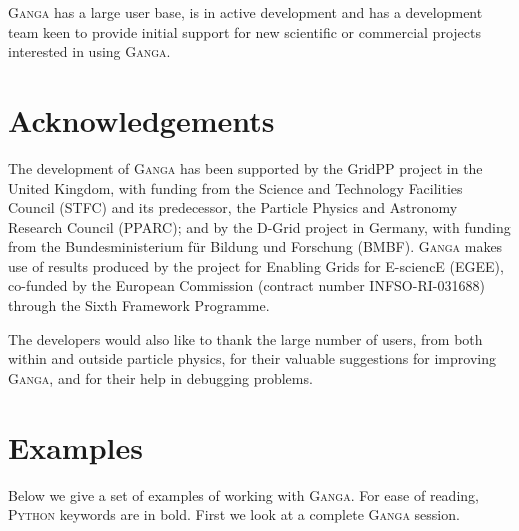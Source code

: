 \documentclass{elsart}
\def\ganga {\textsc{Ganga}\xspace}
\def\python {\textsc{Python}\xspace}
\begin{document}
\ganga has a large user base, is in active development and has a development
team keen to provide initial support for new scientific or commercial
projects interested in using \ganga.

\section{Acknowledgements}
\label{sec:acknowledgements}
The development of \ganga has been supported by the GridPP project in the
United Kingdom, with funding from the Science and Technology
Facilities Council (STFC) and its predecessor, the Particle Physics and
Astronomy Research Council (PPARC); and by the D-Grid project in Germany,
with funding from the Bundesministerium f\"ur Bildung und Forschung
(BMBF).  
\ganga makes use of results produced by the project for Enabling Grids
for E-sciencE (EGEE), co-funded by the European
Commission (contract number INFSO-RI-031688) through the Sixth
Framework Programme.

The developers would also like to thank the large number of users, from both
within and outside particle physics, for their valuable suggestions for
improving \ganga, and for their help in debugging problems.


\appendix

\section{Examples}
\label{sec:examples}
Below we give a set of examples of working with \ganga. For ease of reading,
\python keywords are in bold. First we look at a complete \ganga session.
\vspace{-2ex}
\end{document}
